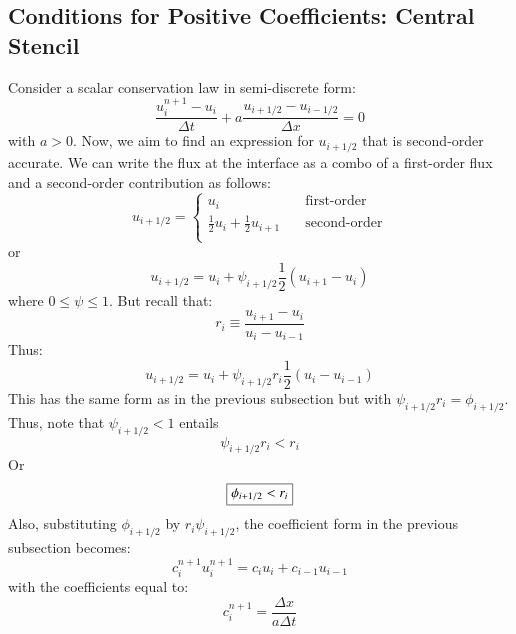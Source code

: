 \documentclass{warpdoc}
\newcommand\frameeqn[1]{\fbox{$\displaystyle #1$}}
\begin{document}
\subsection{Conditions for Positive Coefficients: Central Stencil}

Consider a scalar conservation law in semi-discrete form:
%
\begin{equation}
\frac{u^{n+1}_i - u_i }{\Delta t} + a \frac{u_{i+1/2}-u_{i-1/2}}{\Delta x} =0
\end{equation}
%
with $a>0$.
Now, we aim to find an expression for $u_{i+1/2}$ that is second-order accurate. 
We can write the flux at the interface as a combo of a first-order flux and a second-order contribution as follows:
%
\begin{equation}
  u_{i+1/2}=\left\{ \begin{array}{ll} 
u_{i} & \textrm{~~~first-order}\\
\frac{1}{2} u_{i} + \frac{1}{2} u_{i+1} & \textrm{~~~second-order}\\
\end{array}\right.
\end{equation}
%
or
%
\begin{equation}
  u_{i+1/2}= 
u_{i} + \psi_{i+1/2} \frac{1}{2} (u_{i+1}-u_{i})
\end{equation}
%
where $0\le \psi \le 1$.
But recall that:
%
\begin{equation}
r_{i} \equiv \frac{u_{i+1} - u_{i}}{u_{i} - u_{i-1}}
\end{equation}
%
Thus:
%
\begin{equation}
  u_{i+1/2}= 
u_{i} + \psi_{i+1/2} r_i \frac{1}{2} (u_{i}-u_{i-1})
\end{equation}
%
This has the same form as in the previous subsection but with $\psi_{i+1/2} r_i = \phi_{i+1/2}$. Thus, note that $\psi_{i+1/2}<1$ entails
%
\begin{equation}
\psi_{i+1/2} r_i< r_i
\end{equation}
% 
Or
%
\begin{equation}
\frameeqn{
\phi_{i+1/2} < r_i
}
\end{equation}
% 
Also, substituting $\phi_{i+1/2}$ by $r_i \psi_{i+1/2}$, the coefficient form in the previous subsection becomes:
%
\begin{equation}
c_i^{n+1} u^{n+1}_i = 
  c_i u_i  
+ c_{i-1} u_{i-1}
\end{equation}
%
with the coefficients equal to:
%
\begin{equation}
c_i^{n+1}=\frac{\Delta x}{a\Delta t}
\end{equation}
\end{document}
